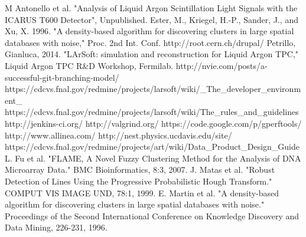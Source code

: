 \documentclass[12pt]{elsarticle}
\begin{document}
\begin{thebibliography}{99}
 M Antonello et al.  "Analysis of Liquid Argon Scintillation Light Signals with the ICARUS T600 Detector", Unpublished.
 Ester, M., Kriegel, H.-P., Sander, J., and Xu, X. 1996. "A density-based algorithm for discovering clusters in large spatial databases with noise," Proc. 2nd Int. Conf.
 http://root.cern.ch/drupal/
 Petrillo, Gianluca, 2014. "LArSoft: simulation and reconstruction for Liquid Argon TPC," Liquid Argon TPC R\&D Workshop, Fermilab.
 http://nvie.com/posts/a-successful-git-branching-model/
 https://cdcvs.fnal.gov/redmine/projects/larsoft/wiki/\_The\_developer\_environment\_
 https://cdcvs.fnal.gov/redmine/projects/larsoft/wiki/The\_rules\_and\_guidelines
 http://jenkins-ci.org/
 http://valgrind.org/
 https://code.google.com/p/gperftools/
 http://www.allinea.com/
 http://nest.physics.ucdavis.edu/site/
 https://cdcvs.fnal.gov/redmine/projects/art/wiki/Data\_Product\_Design\_Guide
 L. Fu et al. "FLAME, A Novel Fuzzy Clustering Method for the Analysis of DNA Microarray Data." BMC Bioinformatics, 8:3, 2007.
 J. Matas et al. "Robust Detection of Lines Using the Progressive Probabilistic Hough Transform." COMPUT VIS IMAGE UND, 78:1, 1999.
 E. Martin et al. "A density-based algorithm for discovering clusters in large spatial databases with noise." Proceedings of the Second International Conference on Knowledge Discovery and Data Mining, 226-231, 1996. 

\end{thebibliography}
\clearpage 
\end{document}

